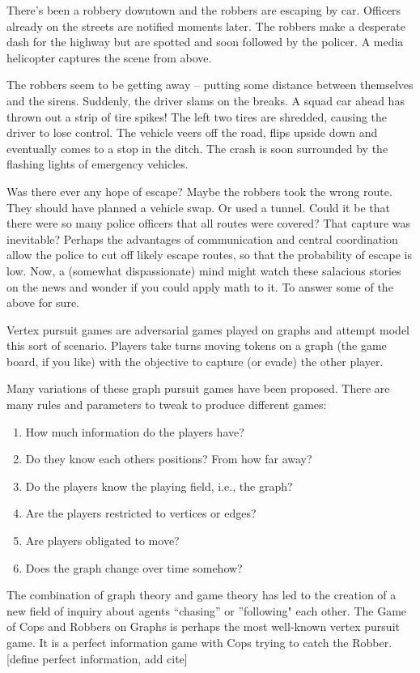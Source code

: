 There's been a robbery downtown and the robbers are escaping by car. Officers
already on the streets are notified moments later. The robbers make a desperate dash for the highway but are spotted and soon followed by the policer. A media helicopter captures the scene from above.

The robbers seem to be getting away -- putting some distance between themselves and the sirens.
Suddenly, the driver slams on the breaks. A squad car ahead has thrown out a strip of tire spikes! The left two tires are shredded, causing the driver to lose control. The vehicle veers off the road, flips upside down and eventually comes to a stop in the ditch. The crash is soon surrounded by
the flashing lights of emergency vehicles.

Was there ever any hope of escape? Maybe the robbers took the wrong route.
They should have planned a vehicle swap. Or used a tunnel. Could it be that there were
so many police officers that all routes were covered? That capture was inevitable?
Perhaps the advantages of communication and central coordination allow the police to
  cut off likely escape routes, so that the probability of escape is low.
Now, a (somewhat dispassionate) mind might watch these salacious stories on the news and wonder
 if you could apply math to it. To answer some of the above for sure.

Vertex pursuit games are adversarial games played on graphs and attempt model this sort
of scenario.
Players take turns moving tokens on a graph (the game board, if you like) with
the objective to capture (or evade) the other player.

Many variations of these graph pursuit games have been proposed. There are many rules and
parameters to tweak to produce different games:

\begin{enumerate}
\item How much information do the players have?
\item Do they know each others positions? From how far away?
\item Do the players know the playing field, i.e., the graph?
\item Are the players restricted to vertices or edges?
\item Are players obligated to move?
\item Does the graph change over time somehow?
\end{enumerate}


The combination of graph theory and game theory has led to the creation of a new
field of inquiry about agents ``chasing'' or ''following" each other.
The Game of Cops and Robbers on Graphs \cite{bonato2011game} is perhaps the most
well-known vertex pursuit game. It is a perfect information game with Cops trying
to catch the Robber. [define perfect information, add cite]

